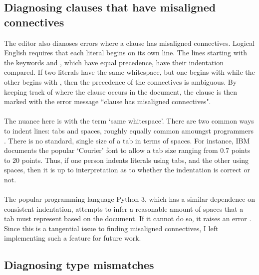 \documentclass[../main.tex]{subfiles}
\begin{document}
\subsection{Diagnosing clauses that have misaligned connectives}
The editor also dianoses errors where a clause has misaligned connectives. Logical English requires that each literal begins on its own line. The lines starting with the keywords  and , which have equal precedence, have their indentation compared. If two literals have the same whitespace, but one begins with  while the other begins with , then the precedence of the connectives is ambiguous. By keeping track of where the clause occurs in the document, the clause is then marked with the error message ``clause has misaligned connectives".
\\
\\
The nuance here is with the term `same whitespace'. There are two common ways to indent lines: tabs and spaces, roughly equally common amoungst programmers \cite{tabs_vs_spaces}. There is no standard, single size of a tab in terms of spaces. For instance, IBM documents the popular `Courier' font to allow a tab size ranging from 0.7 points to 20 points. Thus, if one person indents literals using tabs, and the other using spaces, then it is up to interpretation as to whether the indentation is correct or not.
\\
\\
The popular programming language Python 3, which has a similar dependence on consistent indentation, attempts to infer a reasonable amount of spaces that a tab must represent based on the document. If it cannot do so, it raises an error \cite{python_tabs_spaces}. Since this is a tangential issue to finding misaligned connectives, I left implementing such a feature for future work.

\subsection{Diagnosing type mismatches}
\end{document}
